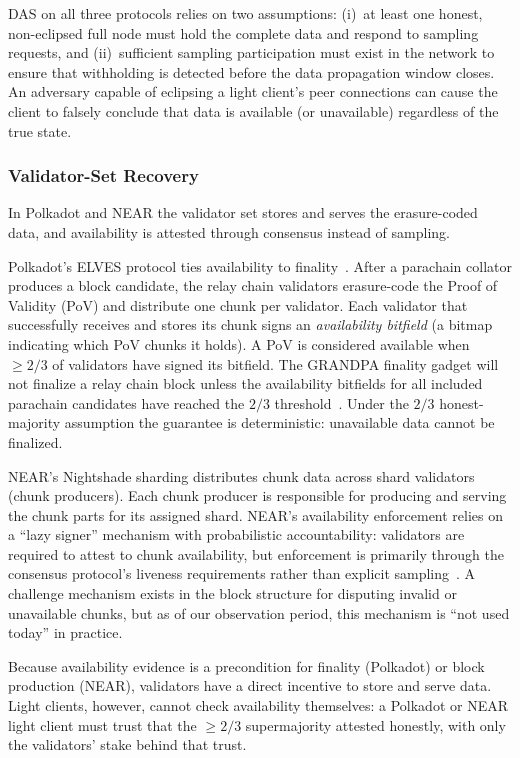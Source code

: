 DAS on all three protocols relies on two assumptions: (i)~at least one honest, non-eclipsed full node must hold the complete data and respond to sampling requests, and (ii)~sufficient sampling participation must exist in the network to ensure that withholding is detected before the data propagation window closes.
An adversary capable of eclipsing a light client's peer connections can cause the client to falsely conclude that data is available (or unavailable) regardless of the true state.

\subsubsection{Validator-Set Recovery}

In Polkadot and NEAR the validator set stores and serves the erasure-coded data, and availability is attested through consensus instead of sampling.

Polkadot's ELVES protocol ties availability to finality~\cite{Jeff_Burdges_ELVES}.
After a parachain collator produces a block candidate, the relay chain validators erasure-code the Proof of Validity (PoV) and distribute one chunk per validator.
Each validator that successfully receives and stores its chunk signs an \emph{availability bitfield} (a bitmap indicating which PoV chunks it holds).
A PoV is considered available when $\geq 2/3$ of validators have signed its bitfield.
The GRANDPA finality gadget will not finalize a relay chain block unless the availability bitfields for all included parachain candidates have reached the $2/3$ threshold~\cite{Overview_of_polkadot, polkadot_article}.
Under the $2/3$ honest-majority assumption the guarantee is deterministic: unavailable data cannot be finalized.

NEAR's Nightshade sharding distributes chunk data across shard validators (chunk producers).
Each chunk producer is responsible for producing and serving the chunk parts for its assigned shard.
NEAR's availability enforcement relies on a ``lazy signer'' mechanism with probabilistic accountability: validators are required to attest to chunk availability, but enforcement is primarily through the consensus protocol's liveness requirements rather than explicit sampling~\cite{NEAR_Nightshade_Scaling_Blockchain}.
A challenge mechanism exists in the block structure for disputing invalid or unavailable chunks, but as of our observation period, this mechanism is ``not used today'' in practice.

Because availability evidence is a precondition for finality (Polkadot) or block production (NEAR), validators have a direct incentive to store and serve data.
Light clients, however, cannot check availability themselves: a Polkadot or NEAR light client must trust that the $\geq 2/3$ supermajority attested honestly, with only the validators' stake behind that trust.

